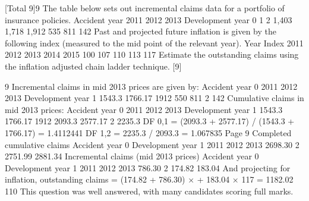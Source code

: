 \documentclass[a4paper,12pt]{article}
\begin{document}
[Total 9]9
The table below sets out incremental claims data for a portfolio of insurance policies.
Accident year
2011
2012
2013
Development year
0
1
2
1,403
1,718
1,912
535
811
142
Past and projected future inflation is given by the following index (measured to the
mid point of the relevant year).
Year Index
2011
2012
2013
2014
2015 100
107
110
113
117
Estimate the outstanding claims using the inflation adjusted chain ladder technique.
[9]















9
Incremental claims in mid 2013 prices are given by:
Accident year
0
2011
2012
2013
Development year
1
1543.3
1766.17
1912
550
811
2
142
Cumulative claims in mid 2013 prices:
Accident year
0
2011
2012
2013
Development year
1
1543.3
1766.17
1912
2093.3
2577.17
2
2235.3
DF 0,1 = (2093.3 + 2577.17) / (1543.3 + 1766.17) = 1.4112441
DF 1,2 = 2235.3 / 2093.3 = 1.067835
Page 9%
Completed cumulative claims
Accident year
0
Development year
1
2011
2012
2013
2698.30
2
2751.99
2881.34
Incremental claims (mid 2013 prices)
Accident year
0
Development year
1
2011
2012
2013
786.30
2
174.82
183.04
And projecting for inflation, outstanding claims = (174.82 + 786.30) ×
+ 183.04 ×
117
= 1182.02
110
This question was well answered, with many candidates scoring full marks.
\end{document}
